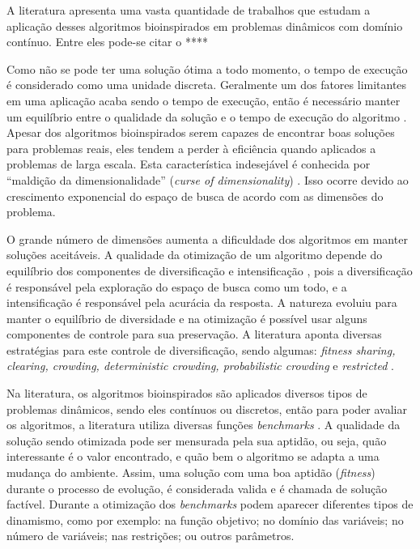 A literatura apresenta uma vasta quantidade de trabalhos que estudam a aplicação desses algoritmos bioinspirados em problemas dinâmicos com domínio contínuo. Entre eles pode-se citar o ****

Como não se pode ter uma solução ótima a todo momento, o tempo de execução é considerado como uma unidade discreta. Geralmente um dos fatores limitantes em uma aplicação acaba sendo o tempo de execução, então é necessário manter um equilíbrio entre o qualidade da solução e o tempo de execução do algoritmo \cite{li2006new}. Apesar dos algoritmos bioinspirados serem capazes de encontrar boas soluções para problemas reais, eles tendem a perder à eficiência quando aplicados a problemas de larga escala. Esta característica indesejável é conhecida por “maldição da dimensionalidade” (\textit{curse of dimensionality}) \cite{bellman2015applied}. Isso ocorre devido ao crescimento exponencial do espaço de busca de acordo com as dimensões do problema.

O grande número de dimensões aumenta a dificuldade dos algoritmos em manter soluções aceitáveis. A qualidade da otimização de um algoritmo depende do equilíbrio dos componentes de diversificação e intensificação \cite{boussaid2013survey}, pois a diversificação é responsável pela exploração do espaço de busca como um todo, e a intensificação é responsável pela acurácia da resposta. A natureza evoluiu para manter o equilíbrio de diversidade e na otimização é possível usar alguns componentes de controle para sua preservação. A literatura aponta diversas estratégias para este controle de diversificação, sendo algumas: \textit{fitness sharing, clearing, crowding, deterministic crowding, probabilistic crowding} e \textit{restricted} \cite{andre2015multiple}.

Na literatura, os algoritmos bioinspirados são aplicados diversos tipos de problemas dinâmicos, sendo eles contínuos ou discretos, então para poder avaliar os algoritmos, a literatura utiliza diversas funções \textit{benchmarks} \cite{moser2007review}. A qualidade da solução sendo otimizada pode ser mensurada pela sua aptidão, ou seja, quão interessante é o valor encontrado, e quão bem o algoritmo se adapta a uma mudança do ambiente. Assim, uma solução com uma boa aptidão (\textit{fitness}) durante o processo de evolução, é considerada valida e é chamada de solução factível. Durante a otimização dos \textit{benchmarks} podem aparecer diferentes tipos de dinamismo, como por exemplo: na função objetivo; no domínio das variáveis; no número de variáveis; nas restrições; ou outros parâmetros.


